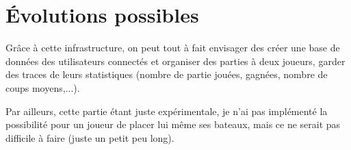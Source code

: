 \section{Évolutions possibles}
Grâce à cette infrastructure, on peut tout à fait envisager des créer une base de données des utilisateurs connectés et organiser des parties à deux joueurs, garder des traces de leurs statistiques (nombre de partie jouées, gagnées, nombre de coups moyens,...).

Par ailleurs, cette partie étant juste expérimentale, je n'ai pas implémenté la possibilité pour un joueur de placer lui même ses bateaux, mais ce ne serait pas difficile à faire (juste un petit peu long). 